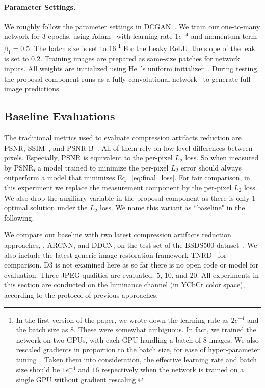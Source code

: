 \documentclass[10pt,twocolumn,letterpaper]{article}
\begin{document}
\paragraph{Parameter Settings.}
We roughly follow the parameter settings in DCGAN~\cite{dcgan}. We train our one-to-many network for $3$ epochs, using Adam~\cite{adam} with learning rate $1e^{-4}$ and momentum term $\beta_1 = 0.5$. The batch size is set to $16$.\footnote{In the first version of the paper, we wrote down the learning rate as $2e^{-4}$ and the batch size as $8$. These were somewhat ambiguous. In fact, we trained the network on two GPUs, with each GPU handling a batch of $8$ images. We also rescaled gradients in proportion to the batch size, for ease of hyper-parameter tuning~\cite{parallel_cnn}. Taken them into consideration, the effective learning rate and batch size should be $1e^{-4}$ and $16$ respectively when the network is trained on a single GPU without gradient rescaling.} For the Leaky ReLU, the slope of the leak is set to $0.2$. Training images are prepared as same-size patches for network inputs. All weights are initialized using He~\etal's uniform initializer~\cite{delving_deep}. During testing, the proposal component runs as a fully convolutional network~\cite{fcn} to generate full-image predictions.

\subsection{Baseline Evaluations}
The traditional metrics used to evaluate compression artifacts reduction are PSNR, SSIM~\cite{ssim}, and PSNR-B~\cite{psnrb}. All of them rely on low-level differences between pixels. Especially, PSNR is equivalent to the per-pixel $L_2$ loss. So when measured by PSNR, a model trained to minimize the per-pixel $L_2$ error should always outperform a model that minimizes Eq.~\eqref{eq:final_loss}. For fair comparison, in this experiment we replace the measurement component by the per-pixel $L_2$ loss. We also drop the auxiliary variable in the proposal component as there is only $1$ optimal solution under the $L_2$ loss. We name this variant as ``baseline" in the following.

We compare our baseline with two latest compression artifacts reduction approaches, \ie, ARCNN, and DDCN, on the test set of the BSDS500 dataset~\cite{bsds500}. We also include the latest generic image restoration framework TNRD~\cite{tnrd} for comparison. D3 is not examined here as so far there is no open code or model for evaluation. Three JPEG qualities are evaluated: $5$, $10$, and $20$. All experiments in this section are conducted on the luminance channel (in YCbCr color space), according to the protocol of previous approaches.
\end{document}

